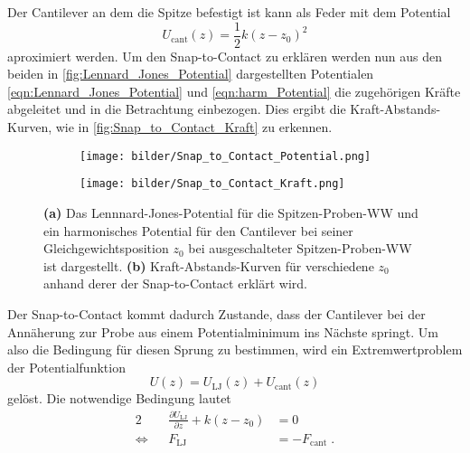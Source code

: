     Der Cantilever an dem die Spitze befestigt ist kann als Feder mit dem Potential
    \begin{equation}
        U_{\mathrm{cant}}(z) = \frac{1}{2}k(z - z_0)^2
        \label{eqn:harm_Potential}
    \end{equation}
    aproximiert werden.
    Um den Snap-to-Contact zu erklären werden nun aus den beiden in \autoref{fig:Lennard_Jones_Potential} dargestellten Potentialen \eqref{eqn:Lennard_Jones_Potential} und \eqref{eqn:harm_Potential} die zugehörigen Kräfte abgeleitet und in die Betrachtung einbezogen.
    Dies ergibt die Kraft-Abstands-Kurven, wie in \autoref{fig:Snap_to_Contact_Kraft} zu erkennen.
    \begin{figure}
        \centering
        \begin{subfigure}{0.49\textwidth}
            \texttt{[image: bilder/Snap\_to\_Contact\_Potential.png]}
            \caption{}
            \label{fig:Snap_to_Contact_Potential}
        \end{subfigure}
        \hfill
        \begin{subfigure}{0.49\textwidth}
            \texttt{[image: bilder/Snap\_to\_Contact\_Kraft.png]}
            \caption{}
            \label{fig:Snap_to_Contact_Kraft}
        \end{subfigure}
        \caption{\textbf{(a)} Das Lennnard-Jones-Potential für die Spitzen-Proben-WW und ein harmonisches Potential für den Cantilever bei seiner Gleichgewichtsposition $z_0$ bei ausgeschalteter Spitzen-Proben-WW ist dargestellt. \textbf{(b)} Kraft-Abstands-Kurven für verschiedene $z_0$ anhand derer der Snap-to-Contact erklärt wird. \cite{voigtlaender}}
        \label{fig:Snap_to_Contact}
    \end{figure}
    \FloatBarrier
    Der Snap-to-Contact kommt dadurch Zustande, dass der Cantilever bei der Annäherung zur Probe aus einem Potentialminimum ins Nächste springt.
    Um also die Bedingung für diesen Sprung zu bestimmen, wird ein Extremwertproblem der Potentialfunktion
    \begin{equation}
        U(z) = U_{\mathrm{LJ}}(z) + U_{\mathrm{cant}}(z)
    \end{equation}
    gelöst. Die notwendige Bedingung lautet
    \begin{alignat}{2}
        && \frac{\partial U_{\mathrm{LJ}}}{\partial z} + k(z - z_0) &= 0 \nonumber\\
        \Leftrightarrow && F_{\mathrm{LJ}} &= -F_{\mathrm{cant}} \;.
    \end{alignat}
